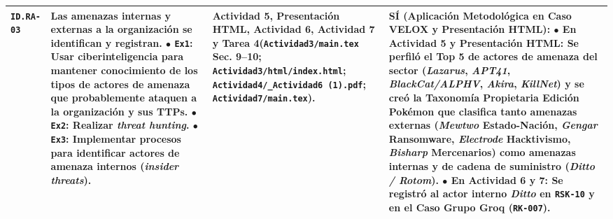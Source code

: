 \documentclass[letterpaper,11pt]{article}
\begin{document}
\begin{longtable}{|C{1.5cm}|L{5.3cm}|L{4.3cm}|L{5.8cm}|}
\texttt{ID.RA-03} &
\textbf{Las amenazas internas y externas a la organización se identifican y registran.}\newline
$\bullet$ \texttt{Ex1}: Usar ciberinteligencia para mantener conocimiento de los tipos de actores de amenaza que probablemente ataquen a la organización y sus TTPs.\newline
$\bullet$ \texttt{Ex2}: Realizar \textit{threat hunting}.\newline
$\bullet$ \texttt{Ex3}: Implementar procesos para identificar actores de amenaza internos (\textit{insider threats}). &
\textbf{Actividad 5, Presentación HTML, Actividad 6, Actividad 7 y Tarea 4}\newline (\texttt{Actividad3/main.tex} Sec. 9--10; \texttt{Actividad3/html/index.html}; \texttt{Actividad4/\_Actividad6 (1).pdf}; \texttt{Actividad7/main.tex}). &
\textbf{SÍ (Aplicación Metodológica en Caso VELOX y Presentación HTML):}\newline
$\bullet$ \textbf{En Actividad 5 y Presentación HTML:} Se perfiló el Top 5 de actores de amenaza del sector (\textit{Lazarus}, \textit{APT41}, \textit{BlackCat/ALPHV}, \textit{Akira}, \textit{KillNet}) y se creó la \textbf{Taxonomía Propietaria Edición Pokémon} que clasifica tanto amenazas externas (\textit{Mewtwo} Estado-Nación, \textit{Gengar} Ransomware, \textit{Electrode} Hacktivismo, \textit{Bisharp} Mercenarios) como \textbf{amenazas internas y de cadena de suministro} (\textit{Ditto / Rotom}).\newline
$\bullet$ \textbf{En Actividad 6 y 7:} Se registró al actor interno \textit{Ditto} en \texttt{RSK-10} y en el Caso Grupo Groq (\texttt{RK-007}). \\
\hline


\end{longtable}
\end{document}
